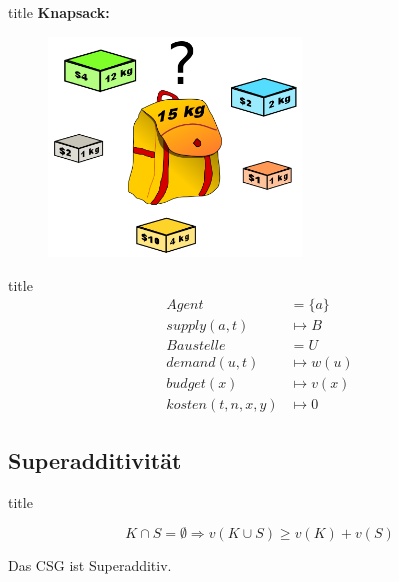 \documentclass[c]{beamer}
\theoremstyle{break}
\begin{document}
  \begin{frame}{title} %
    \textbf{Knapsack:}
    \begin{figure}
      \centering
      \includegraphics[width=0.6\textwidth]{Knapsack.png}
    \end{figure}
  \end{frame}

  \begin{frame}{title}
    \begin{align}
      Agent &= \{a\} \\
      supply(a, t) &\mapsto B \\
      Baustelle &= U \\
      demand(u, t) &\mapsto w(u) \\
      budget(x) &\mapsto v(x) \\
      kosten(t, n, x, y) &\mapsto 0
    \end{align}
  \end{frame}

  \subsection*{Superadditivität}
  \begin{frame}{title} %
    \begin{definition}[Superadditivität]
      \[ K\cap S =\emptyset \Rightarrow v(K\cup S) \geq v(K) + v(S) \]
    \end{definition}
    \begin{lemma}
      Das CSG ist Superadditiv. \\
    \end{lemma}
  \end{frame}
\end{document}
